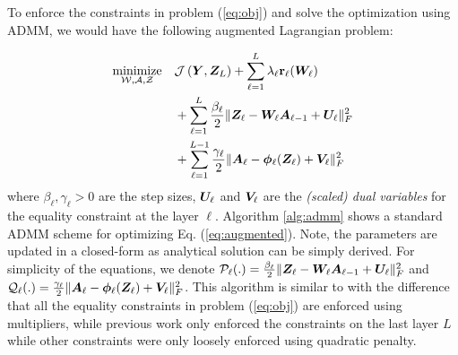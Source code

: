 To enforce the constraints in problem (\ref{eq:obj}) and solve the optimization using ADMM, we would have the following augmented Lagrangian problem:

\begin{eqnarray} \label{eq:augmented}
	\operatorname*{\rm minimize}_{ \mathcal{W}, \mathcal{A}, \mathcal{Z}} \quad &\mathcal{J}\left({\bm{Y}}, {\bm{Z}}_{L} \right) + \sum_{\ell = 1}^{L} \lambda_{\ell}  {\bf r}_{\ell} ({\bm{W}}_{\ell}) \\
	& + \sum_{\ell=1}^{L} \frac{\beta_{\ell}}{2} \| {\bm{Z}}_{\ell} - {\bm{W}}_{\ell} {\bm{A}}_{\ell-1} + {\bm{U}}_{\ell}\|_{F}^{2} \nonumber\\
	& + \sum_{\ell=1}^{L-1} \frac{\gamma_{\ell}}{2} \| {\bm{A}}_{\ell} - {\bm \phi}_{\ell}({\bm{Z}}_{\ell}) + {\bm{V}}_{\ell}\|_{F}^{2}\nonumber
\end{eqnarray}
where $\beta_{\ell}, \gamma_\ell >0$ are the step sizes, ${\bm{U}}_{\ell}$ and ${\bm{V}}_{\ell}$ are the \textit{(scaled) dual variables} \cite{boyd2011distributed} for the equality constraint at the layer $\ell$. 
Algorithm \ref{alg:admm} shows a standard ADMM scheme for optimizing Eq. (\ref{eq:augmented}). Note, the parameters are updated in a closed-form as analytical solution can be simply derived. For simplicity of the equations, we denote ${\mathcal{P}}_\ell (.) = \frac{\beta_{\ell}}{2} \| {\bm{Z}}_{\ell} - {\bm{W}}_{\ell} {\bm{A}}_{\ell-1} + {\bm{U}}_{\ell}\|_{F}^{2} $ and ${\mathcal{Q}}_\ell (.) = \frac{\gamma_{\ell}}{2} \| {\bm{A}}_{\ell} - {\bm \phi}_{\ell}({\bm{Z}}_{\ell}) + {\bm{V}}_{\ell}\|_{F}^{2}$. This algorithm is similar to \cite{taylor2016training,wang2019admm} with the difference that all the equality constraints in problem (\ref{eq:obj}) are enforced using multipliers, while previous work only enforced the constraints on the last layer $L$ while other constraints were only loosely enforced using quadratic penalty. 

